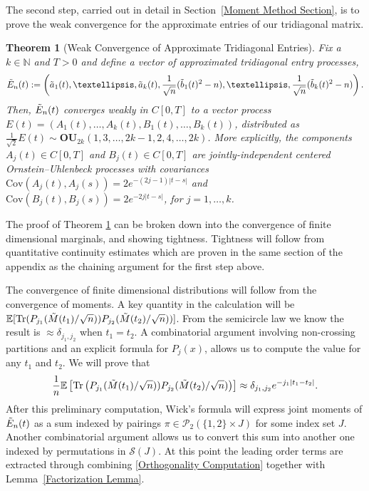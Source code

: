 \documentclass{amsart}
\newtheorem{thm}{Theorem}[section]
\numberwithin{equation}{section}
\newcommand{\E}{\mathbb{E}}
\begin{document}
The second step, carried out in detail in Section~\ref{Moment Method Section}, is to prove the weak convergence for the  approximate entries of our tridiagonal matrix.

\begin{thm}[Weak Convergence of Approximate Tridiagonal Entries]\label{Weak Convergence of Approximate Tridiagonal Entries} 
Fix a $k \in \mathbb{N}$ and $T>0$ and define a vector of approximated tridiagonal entry processes,
\begin{equation*}
    \Tilde{E}_n(t):=\left(\Tilde{a}_1(t),\dots ,\Tilde{a}_k(t), \frac{1}{\sqrt{n}}(\Tilde{b}_1(t)^2-n),\dots ,\frac{1}{\sqrt{n}}(\Tilde{b}_k(t)^2-n)\right).
\end{equation*} Then, $\Tilde{E}_n(t)$ converges weakly in $C[0,T]$ to a vector process $E(t)=(A_1(t),\dots ,A_k(t),B_1(t),\dots,B_k(t))$, distributed as $\frac{1}{\sqrt{2}}E(t) \sim \mathbf{OU}_{2k}(1,3,\dots ,2k-1,2,4,\dots ,2k)$. More explicitly, the components $A_j(t) \in C[0,T]$ and $B_j(t) \in C[0,T]$ are jointly-independent centered Ornstein--Uhlenbeck processes with covariances $\mathrm{Cov}(A_j(t),A_j(s))=2e^{-(2j-1)|t-s|}$ and $\mathrm{Cov}(B_j(t),B_j(s))=2e^{-2j|t-s|}$, for $j=1,\dots ,k$.
\end{thm}

The proof of Theorem \ref{Weak Convergence of Approximate Tridiagonal Entries} can be broken down into the convergence of finite dimensional marginals, and showing tightness. Tightness will follow from quantitative continuity estimates which are proven in the same section of the appendix as the chaining argument for the first step above. 

The convergence of finite dimensional distributions will follow from the convergence of moments. A key quantity in the calculation will be $\E[\mathrm{Tr}(P_{j_1}(\Tilde{M}(t_1)/\sqrt{n}))P_{j_2}(\Tilde{M}(t_2)/\sqrt{n}))]$. From the semicircle law we know the result is $\approx \delta_{j_1,j_2}$ when $t_1=t_2$. A combinatorial argument involving non-crossing partitions and an explicit formula for $P_j(x)$, allows us to compute the value for any $t_1$ and $t_2$. We will prove that
\begin{equation}\label{Orthogonality Computation}
    \frac{1}{n}\E\left[\mathrm{Tr}\left(P_{j_1}(\Tilde{M}(t_1)/\sqrt{n}))P_{j_2}(\Tilde{M}(t_2)/\sqrt{n})\right)\right] \approx \delta_{j_1,j_2}e^{-j_1 |t_1-t_2|}.
\end{equation}
\noindent
After this preliminary computation, Wick's formula will express joint moments of $\Tilde{E}_n(t)$ as a sum indexed by pairings $\pi \in \mathcal{P}_2(\{1,2\}\times J)$ for some index set $J$. Another combinatorial argument allows us to convert this sum into another one indexed by permutations in $\mathcal{S}(J)$. At this point the leading order terms are extracted through combining \eqref{Orthogonality Computation} together with Lemma~\ref{Factorization Lemma}. \\
\end{document}

